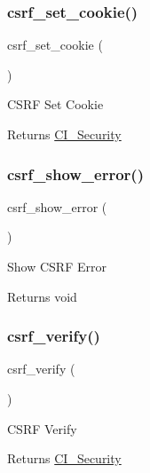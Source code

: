 \subsubsection{\texorpdfstring{csrf\+\_\+set\+\_\+cookie()}{csrf\_set\_cookie()}}
{\footnotesize\ttfamily csrf\+\_\+set\+\_\+cookie (\begin{DoxyParamCaption}{ }\end{DoxyParamCaption})}

C\+S\+RF Set Cookie

\begin{DoxyReturn}{Returns}
\mbox{\hyperlink{class_c_i___security}{C\+I\+\_\+\+Security}} 
\end{DoxyReturn}
\mbox{\label{class_c_i___security_a3d09c1dc706abfaad987661805c28a06}} 
\subsubsection{\texorpdfstring{csrf\+\_\+show\+\_\+error()}{csrf\_show\_error()}}
{\footnotesize\ttfamily csrf\+\_\+show\+\_\+error (\begin{DoxyParamCaption}{ }\end{DoxyParamCaption})}

Show C\+S\+RF Error

\begin{DoxyReturn}{Returns}
void 
\end{DoxyReturn}
\mbox{\label{class_c_i___security_a03c037268db0c2e6221b65a736eaee07}} 
\subsubsection{\texorpdfstring{csrf\+\_\+verify()}{csrf\_verify()}}
{\footnotesize\ttfamily csrf\+\_\+verify (\begin{DoxyParamCaption}{ }\end{DoxyParamCaption})}

C\+S\+RF Verify

\begin{DoxyReturn}{Returns}
\mbox{\hyperlink{class_c_i___security}{C\+I\+\_\+\+Security}} 
\end{DoxyReturn}
\mbox{\label{class_c_i___security_a8bec9918f4d35c9e6340e1dc6a32ba14}} 
